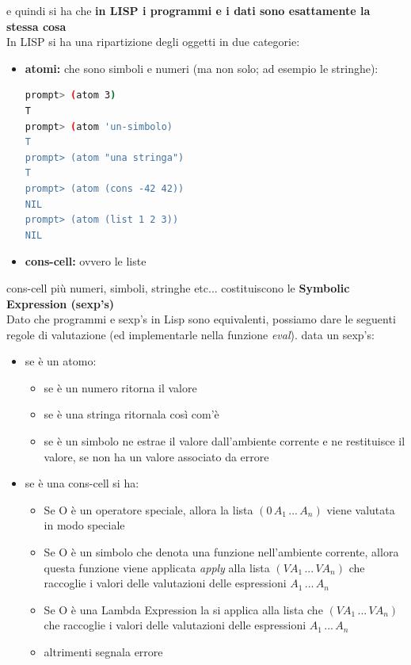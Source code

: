 \documentclass[a4paper,12pt, oneside]{book}
\begin{document}
e quindi si ha che \textbf{in LISP i programmi e i dati sono esattamente la stessa cosa}\\
In LISP si ha una ripartizione degli oggetti in due categorie:
\begin{itemize}
	\item \textbf{atomi:} che sono simboli e numeri (ma non solo; ad esempio le stringhe):
	      \begin{shaded}
		      \begin{lstlisting}[language=bash]
prompt> (atom 3)
T
prompt> (atom 'un-simbolo)
T
prompt> (atom "una stringa")
T
prompt> (atom (cons -42 42))
NIL
prompt> (atom (list 1 2 3))
NIL
\end{lstlisting}
	      \end{shaded}
	\item \textbf{cons-cell:} ovvero le liste
\end{itemize}
cons-cell più numeri, simboli, stringhe etc... costituiscono le \textbf{Symbolic Expression (sexp's)}\\
Dato che programmi e sexp's in Lisp sono equivalenti, possiamo dare le seguenti regole di valutazione (ed implementarle nella funzione \textit{eval}). data un sexp's:
\begin{itemize}
	\item se è un atomo:
	      \begin{itemize}
		      \item se è un numero ritorna il valore
		      \item se è una stringa ritornala così com'è
		      \item se è un simbolo ne estrae il valore dall'ambiente corrente e ne restituisce il valore, se non ha un valore associato da errore
	      \end{itemize}
	\item se è una cons-cell si ha:
	      \begin{itemize}
		      \item Se O è un operatore speciale, allora la lista $(0\, A_1\,...\,A_n)$ viene valutata in modo speciale
		      \item Se O è un simbolo che denota una funzione nell'ambiente corrente, allora questa
		            funzione viene applicata \textit{apply} alla lista $(VA_1\,...\, VA_n)$ che raccoglie i
		            valori delle valutazioni delle espressioni $A_1\,...\,A_n$
		      \item Se O è una Lambda Expression la si applica alla lista che $(VA_1\,...\, VA_n)$
		            che raccoglie i valori delle valutazioni delle espressioni $A_1\,...\,A_n$
		      \item altrimenti segnala errore
	      \end{itemize}
\end{itemize}
\end{document}
